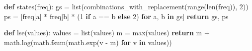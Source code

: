 \documentclass[
]{article}
\newenvironment{Shaded}{}{}
\newcommand{\BuiltInTok}[1]{\textcolor[rgb]{0.00,0.50,0.00}{#1}}
\newcommand{\ControlFlowTok}[1]{\textcolor[rgb]{0.00,0.44,0.13}{\textbf{#1}}}
\newcommand{\DecValTok}[1]{\textcolor[rgb]{0.25,0.63,0.44}{#1}}
\newcommand{\KeywordTok}[1]{\textcolor[rgb]{0.00,0.44,0.13}{\textbf{#1}}}
\newcommand{\NormalTok}[1]{#1}
\newcommand{\OperatorTok}[1]{\textcolor[rgb]{0.40,0.40,0.40}{#1}}
\begin{document}
\begin{Shaded}
\begin{Highlighting}[]
\KeywordTok{def}\NormalTok{ states(freq):}
\NormalTok{    gs }\OperatorTok{=} \BuiltInTok{list}\NormalTok{(combinations\_with\_replacement(}\BuiltInTok{range}\NormalTok{(}\BuiltInTok{len}\NormalTok{(freq)), }\DecValTok{2}\NormalTok{))}
\NormalTok{    ps }\OperatorTok{=}\NormalTok{ [freq[a] }\OperatorTok{*}\NormalTok{ freq[b] }\OperatorTok{*}\NormalTok{ (}\DecValTok{1} \ControlFlowTok{if}\NormalTok{ a }\OperatorTok{==}\NormalTok{ b }\ControlFlowTok{else} \DecValTok{2}\NormalTok{) }\ControlFlowTok{for}\NormalTok{ a, b }\KeywordTok{in}\NormalTok{ gs]}
    \ControlFlowTok{return}\NormalTok{ gs, ps}


\KeywordTok{def}\NormalTok{ lse(values):}
\NormalTok{    values }\OperatorTok{=} \BuiltInTok{list}\NormalTok{(values)}
\NormalTok{    m }\OperatorTok{=} \BuiltInTok{max}\NormalTok{(values)}
    \ControlFlowTok{return}\NormalTok{ m }\OperatorTok{+}\NormalTok{ math.log(math.fsum(math.exp(v }\OperatorTok{{-}}\NormalTok{ m) }\ControlFlowTok{for}\NormalTok{ v }\KeywordTok{in}\NormalTok{ values))}



\end{Highlighting}
\end{Shaded}
\end{document}
